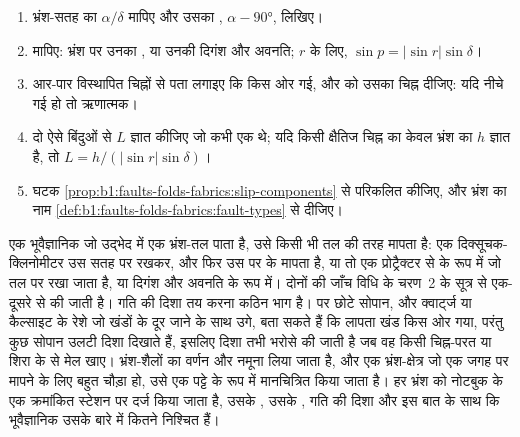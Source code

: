 \begin{method}[भ्रंश पर सरकन मापना]\label{met:b1:faults-folds-fabrics:slip}
\begin{enumerate}
  \item भ्रंश-सतह का  $\alpha/\delta$ मापिए और उसका , $\alpha - \ang{90}$, लिखिए।
  \item {} मापिए: भ्रंश पर उनका , या उनकी दिगंश और अवनति;  $r$ के लिए, $\sin p = |\sin r|\sin\delta$।
  \item आर-पार विस्थापित चिह्नों से पता लगाइए कि  किस ओर गई, और  को उसका चिह्न दीजिए: यदि  नीचे गई हो तो ऋणात्मक।
  \item दो ऐसे बिंदुओं से  $L$ ज्ञात कीजिए जो कभी एक थे; यदि किसी क्षैतिज चिह्न का केवल भ्रंश का  $h$ ज्ञात है, तो $L = h/(|\sin r|\sin\delta)$।
  \item घटक \cref{prop:b1:faults-folds-fabrics:slip-components} से परिकलित कीजिए, और भ्रंश का नाम \cref{def:b1:faults-folds-fabrics:fault-types} से दीजिए।
\end{enumerate}
\end{method}

\begin{inthefield}[भ्रंश-तल का मापन]
एक भूवैज्ञानिक जो उद्भेद में एक भ्रंश-तल पाता है, उसे किसी भी तल की तरह मापता है: एक दिक्सूचक-क्लिनोमीटर उस सतह पर रखकर, और फिर उस पर के  मापता है, या तो एक प्रोट्रैक्टर से  के रूप में जो तल पर रखा जाता है, या दिगंश और अवनति के रूप में। दोनों की जाँच विधि के चरण~2 के सूत्र से एक-दूसरे से की जाती है। गति की दिशा तय करना कठिन भाग है।  पर छोटे सोपान, और क्वार्ट्ज या कैल्साइट के रेशे जो खंडों के दूर जाने के साथ उगे, बता सकते हैं कि लापता खंड किस ओर गया, परंतु कुछ सोपान उलटी दिशा दिखाते हैं, इसलिए दिशा तभी भरोसे की जाती है जब वह किसी चिह्न-परत या शिरा के  से मेल खाए। भ्रंश-शैलों का वर्णन और नमूना लिया जाता है, और एक भ्रंश-क्षेत्र जो एक जगह पर मापने के लिए बहुत चौड़ा हो, उसे एक पट्टे के रूप में मानचित्रित किया जाता है। हर भ्रंश को नोटबुक के एक क्रमांकित स्टेशन पर दर्ज किया जाता है, उसके , उसके , गति की दिशा और इस बात के साथ कि भूवैज्ञानिक उसके बारे में कितने निश्चित हैं।
\end{inthefield}

